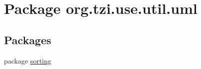 \hypertarget{namespaceorg_1_1tzi_1_1use_1_1util_1_1uml}{\section{Package org.\-tzi.\-use.\-util.\-uml}
\label{namespaceorg_1_1tzi_1_1use_1_1util_1_1uml}
}
\subsection*{Packages}
\begin{DoxyCompactItemize}
\item 
package \hyperlink{namespaceorg_1_1tzi_1_1use_1_1util_1_1uml_1_1sorting}{sorting}
\end{DoxyCompactItemize}
